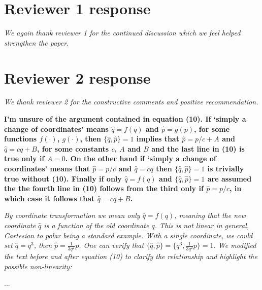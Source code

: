 \documentclass[11pt]{article}
\begin{document}
\section*{Reviewer 1 response}

\emph{We again thank reviewer 1 for the continued discussion which we feel helped strengthen the paper.}
\bigskip


\section*{Reviewer 2 response}

\emph{We thank reviewer 2 for the constructive comments and positive recommendation.}
\bigskip

\textbf{I’m unsure of the argument contained in equation (10). If ‘simply a change
	of coordinates’ means $\hat{q} = f(q)$ and $\hat{p} = g(p)$, for some functions $f(\cdot)$, $g(\cdot)$,	then $\{\hat{q}, \hat{p}\} = 1$ implies that $\hat{p} = p/c+A$ and $\hat{q} = cq+B$, for some constants $c$, $A$ and $B$ and the last line in (10) is true only if $A = 0$. On the other
	hand if ‘simply a change of coordinates’ means that $\hat{p} = p/c$ and $\hat{q} = cq$
	then $\{\hat{q}, \hat{p}\} = 1$ is trivially true without (10). Finally if only $\hat{q} = f(q)$ and
	$\{\hat{q}, \hat{p}\} = 1$ are assumed the the fourth line in (10) follows from the third
	only if $\hat{p} = p/c$, in which case it follows that $\hat{q} = cq + B$. }

\emph{By coordinate transformation we mean only $\hat{q} = f(q)$, meaning that the new coordinate $\hat{q}$ is a function of the old coordinate $q$. This is not linear in general, Cartesian to polar being a standard example. With a single coordinate, we could set $\hat{q} = q^3$, then $\hat{p} = \frac{1}{3 q^2} p$. One can verify that $\{\hat{q}, \hat{p}\} = \{ q^3, \frac{1}{3 q^2} p \} = 1$. We modified the text before and after equation (10) to clarify the relationship and highlight the possible non-linearity:}

\bigskip

...
\end{document}
